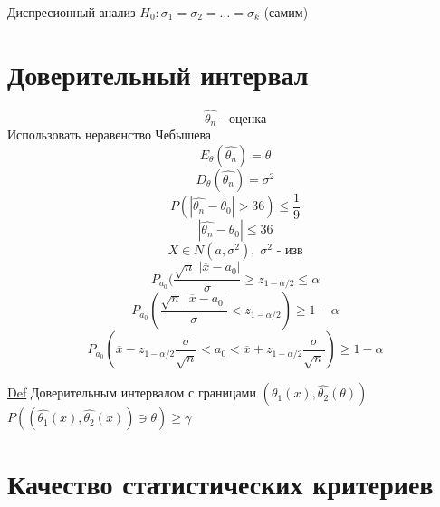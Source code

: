 \documentclass[a4paper]{article}
\begin{document}
Диспресионный анализ $ H_0: \sigma_1 = \sigma_2 = \dots = \sigma_k $ (самим)

\section*{\centering Доверительный интервал}
\[
    \hat{\theta_n} \text{ - оценка}
\]
Использовать неравенство Чебышева
\[
    E_{\theta}(\hat{\theta_n}) = \theta
\]
\[
    D_{\theta}(\hat{\theta_n}) = \sigma^2
\]
\[
    P(| \hat{\theta_n} - \theta_0 | > 36) \leq \frac{1}{9} 
\]
\[
    | \hat{\theta_n} - \theta_0 | \leq 36
\]
\[
    X \in N(a, \sigma^2), \; \sigma^2 \text{ - изв}
\]
\[
    P_{a_0}( \frac{\sqrt{n} \; | \overline{x} - a_0 |}{\sigma} \geq z_{1- \alpha/2}
    \leq \alpha
\]
\[
    P_{a_0}(\frac{\sqrt{n} \; | \overline{x} - a_0 |}{\sigma} < z_{1 - \alpha/2})
    \geq 1 - \alpha
\]
\[
    P_{a_0}(\overline{x} - z_{1 - \alpha/2}\frac{\sigma}{\sqrt{n} } < a_0 < 
    \overline{x} + z_{1 - \alpha /2} \frac{\sigma}{\sqrt{n} }) \geq 1 - \alpha 
\]

\underline{Def} Доверительным интервалом с границами $ (\hat{\theta_1}(x), \hat{\theta_2}(
\theta))$ \\
$ P( (\hat{\theta_1}(x), \hat{\theta_2}(x) ) \ni \theta) \geq \gamma $ 

\section*{\centering Качество статистических критериев}
\end{document}
